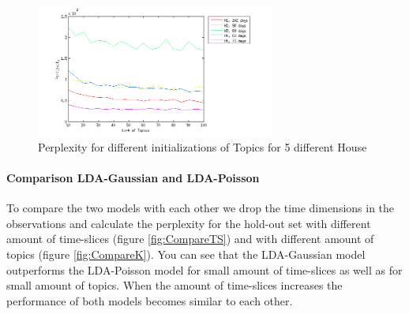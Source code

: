 \begin{figure}[h!]
 \centering
 \includegraphics[width=0.7\textwidth]{Pictures/PerplGaus.png}
 \caption{Perplexity for different initializations of Topics for 5 different House}
 \label{fig:PerplGaus}
\end{figure}

\paragraph{Comparison LDA-Gaussian and LDA-Poisson}

To compare the two models with each other we drop the time dimensions in the observations and calculate the perplexity for the hold-out set with different amount of time-slices (figure \ref{fig:CompareTS}) and with different amount of topics (figure \ref{fig:CompareK}).
You can see that the LDA-Gaussian model outperforms the LDA-Poisson model for small amount of time-slices as well as for small amount of topics. When the amount of time-slices increases the performance of both models becomes similar to each other. 

